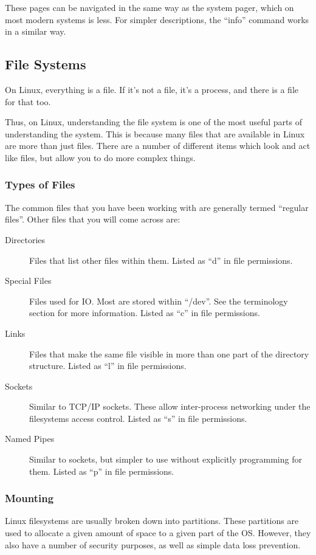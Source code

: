 			These pages can be navigated in the same way as the system pager, which on most modern systems is less.
			For simpler descriptions, the ``info'' command works in a similar way.

		\subsection{File Systems}
			On Linux, everything is a file.
			If it's not a file, it's a process, and there is a file for that too.

			Thus, on Linux, understanding the file system is one of the most useful parts of understanding the system.
			This is because many files that are available in Linux are more than just files.
			There are a number of different items which look and act like files, but allow you to do more complex things.

			\subsubsection{Types of Files}
				The common files that you have been working with are generally termed ``regular files''.
				Other files that you will come across are:
				\begin{description}
					\item[Directories] Files that list other files within them.
						Listed as ``d'' in file permissions.
					\item[Special Files] Files used for IO. Most are stored within ``/dev''.
						See the terminology section for more information.
						Listed as ``c'' in file permissions.
					\item[Links] Files that make the same file visible in more than one part of the directory structure.
						Listed as ``l'' in file permissions.
					\item[Sockets] Similar to TCP/IP sockets.
						These allow inter-process networking under the filesystems access control.
						Listed as ``s'' in file permissions.
					\item[Named Pipes] Similar to sockets, but simpler to use without explicitly programming for them.
						Listed as ``p'' in file permissions.
				\end{description}


			\subsubsection{Mounting}
				Linux filesystems are usually broken down into partitions.
				These partitions are used to allocate a given amount of space to a given part of the OS.
				However, they also have a number of security purposes, as well as simple data loss prevention.

